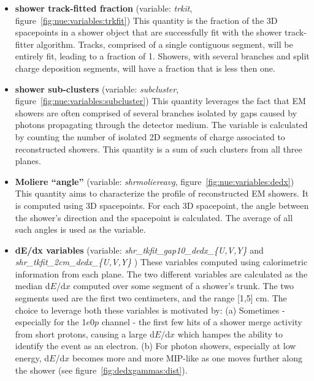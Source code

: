 \begin{itemize}
    \item \textbf{shower track-fitted fraction} (variable: \emph{trkit}, figure~\ref{fig:nue:variables:trkfit}) This quantity is the fraction of the 3D spacepoints in a shower object that are successfully fit with the shower track-fitter algorithm. Tracks, comprised of a single contiguous segment, will be entirely fit, leading to a fraction of 1. Showers, with several branches and split charge deposition segments, will have a fraction that is less then one.
    \item \textbf{shower sub-clusters} (variable: \emph{subcluster}, figure~\ref{fig:nue:variables:subcluster}) This quantity leverages the fact that EM showers are often comprised of several branches isolated by gaps caused by photons propagating through the detector medium. The variable is calculated by counting the number of isolated 2D segments of charge associated to reconstructed showers. This quantity is a sum of such clusters from all three planes.
    \item \textbf{Moliere ``angle''} (variable: \emph{shrmoliereavg}, figure~\ref{fig:nue:variables:dedx}) This quantity aims to characterize the profile of reconstructed EM showers. It is computed using 3D spacepoints. For each 3D spacepoint, the angle between the shower's direction and the spacepoint is calculated. The average of all such angles is used as the variable.
    \item \textbf{dE/dx variables} (variable: \emph{shr\_tkfit\_gap10\_dedx\_\{U,V,Y\}} and \emph{shr\_tkfit\_2cm\_dedx\_\{U,V,Y\}} )  These variables computed using calorimetric information from each plane. The two different variables are calculated as the median d$E$/d$x$ computed over some segment of a shower's trunk. The two segments used are the first two centimeters, and the range [1,5] cm. The choice to leverage both these variables  is motivated by: (a) Sometimes - especially for the 1$e$0$p$ channel - the first few hits of a shower merge activity from short protons, causing a large d$E$/d$x$ which hampes the ability to identify the event as an electron. (b) For photon showers, especially at low energy, d$E$/d$x$ becomes more and more MIP-like as one moves further along the shower (see figure~\ref{fig:dedxgammas:dist}).
\end{itemize}{}



